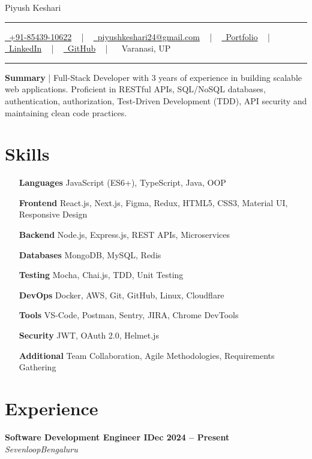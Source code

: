 \documentclass[letterpaper, 10pt]{article}
\newcommand{\documentTitle}[2]{
\begin{center}
    {\Huge\color{accentTitle} #1}
    \vspace{1pt}
    {\color{accentLine} \hrule height 0.8pt}
    \vspace{1pt}
    \footnotesize{#2}
    \vspace{1pt}
    {\color{accentLine} \hrule height 0.8pt}
\end{center}
}
\newcommand{\tinysection}[1]{ \phantomsection
\addcontentsline{toc}{section}{#1}
{\large{\bfseries\color{accentText}#1} {\color{accentLine} |}}
\vspace{1pt}
}
\newcommand{\heading}[2]{ \hspace{5pt}#1\hfill#2\\[1pt] }
\newcommand{\headingBf}[2]{ \heading{\textbf{#1}}{\textbf{#2}} }
\newcommand{\headingIt}[2]{ \heading{\textit{#1}}{\textit{#2}} }
\begin{document}
\documentTitle{Piyush Keshari}{ \href{tel:+918543910622}{ \raisebox{-0.05\height}{\faPhone}\ +91-85439-10622} ~ | ~ \href{mailto:piyushkeshari24@gmail.com}{ \raisebox{-0.15\height}{\faEnvelope}\ piyushkeshari24@gmail.com} ~ | ~ \href{https://kesharipiyush24.github.io/}{ \raisebox{-0.15\height}{\faGlobe}\ Portfolio} ~ | ~ \href{https://linkedin.com/in/piyush-k-ba3a67134}{ \raisebox{-0.15\height}{\faLinkedin}\ LinkedIn} ~ | ~ \href{https://github.com/KeshariPiyush24}{ \raisebox{-0.15\height}{\faGithub}\ GitHub} ~ | ~  \raisebox{-0.15\height}{\faMapMarker}\ Varanasi, UP}

\tinysection{Summary} Full-Stack Developer with 3 years of experience in building scalable web applications. Proficient in RESTful APIs, SQL/NoSQL databases, authentication, authorization, Test-Driven Development (TDD), API security and maintaining clean code practices.

\section{Skills}
\begin{multicols}{2}
    \begin{itemize}[itemsep=0.5pt, parsep=0.5pt, leftmargin=65pt]
        \item[\textbf{Languages}] JavaScript (ES6+), TypeScript, Java, OOP
        \item[\textbf{Frontend}] React.js, Next.js, Figma, Redux, HTML5, CSS3, Material UI,
        Responsive Design
        \item[\textbf{Backend}] Node.js, Express.js, REST APIs, Microservices
        \item[\textbf{Databases}] MongoDB, MySQL, Redis
        \item[\textbf{Testing}] Mocha, Chai.js, TDD, Unit Testing
        \item[\textbf{DevOps}] Docker, AWS, Git, GitHub,
        Linux, Cloudflare
        \item[\textbf{Tools}] VS-Code, Postman, Sentry, JIRA, Chrome DevTools
        \item[\textbf{Security}] JWT, OAuth 2.0, Helmet.js
        \item[\textbf{Additional}] Team Collaboration, Agile Methodologies, Requirements Gathering
    \end{itemize}
\end{multicols}

\section{Experience}
\headingBf{Software Development Engineer I}{Dec 2024 -- Present}
\headingIt{Sevenloop}{Bengaluru}
\end{document}
